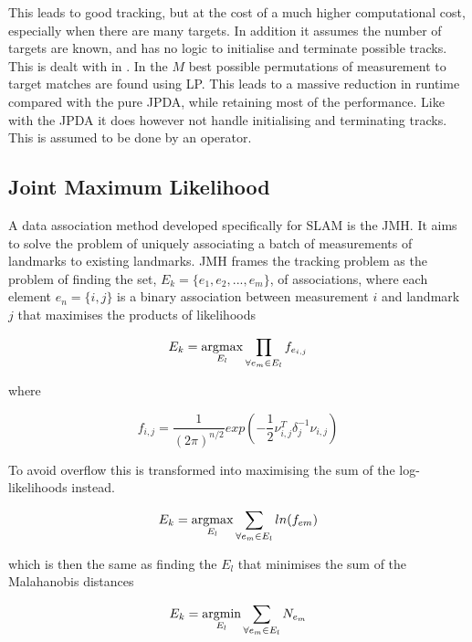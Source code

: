 This leads to good tracking, but at the cost of a much higher computational cost, especially when there are many targets. In addition it assumes the number of targets are known, and has no logic to initialise and terminate possible tracks. This is dealt with in \cite{Multitrack}. In \cite{JPDARev} the $M$ best possible permutations of measurement to target matches are found using \gls{LP}. This leads to a massive reduction in runtime compared with the pure \gls{JPDA}, while retaining most of the performance. Like with the \gls{JPDA} it does however not handle initialising and terminating tracks. This is assumed to be done by an operator.

\subsection{Joint Maximum Likelihood}

A data association method developed specifically for \gls{SLAM} is the \gls{JMH}\cite{JMH}. It aims to solve the problem of uniquely associating a batch of measurements of landmarks to existing landmarks. \gls{JMH} frames the tracking problem as the problem of finding the set, $E_k = \{ e_1, e_2, ... , e_m\} $, of associations, where each element $e_n = \{i,j\}$ is a binary association between measurement $i$ and landmark $j$ that maximises the products of likelihoods

\begin{equation}
    E_k = \operatorname*{argmax}_{E_l} \prod_{\forall e_m \in E_l} f_{e_{i,j}}
\end{equation}

where 

\begin{equation}
    f_{i,j} = \frac{1}{(2\pi)^{n/2}} exp(-\frac{1}{2}\nu_{i,j}^T\delta_j^{-1}\nu_{i,j})
\end{equation}

To avoid overflow this is transformed into maximising the sum of the log-likelihoods instead.

\begin{equation}
    E_k = \operatorname*{argmax}_{E_l} \sum_{\forall e_m \in E_l} ln(f_{em})
\end{equation}

which is then the same as finding the $E_l$ that minimises the sum of the Malahanobis distances

\begin{equation}
    E_k = \operatorname*{argmin}_{E_l} \sum_{\forall e_m \in E_l} N_{e_m}
\end{equation}

